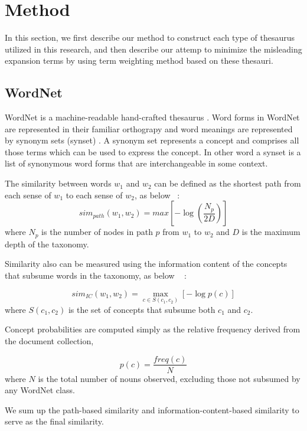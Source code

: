 \section{Method}
In this section, we first describe our method to construct each type of thesaurus utilized in this research, and then describe our attemp to minimize the misleading expansion terms by using term weighting method based on these thesauri.

\subsection{WordNet}
WordNet is a machine-readable hand-crafted thesaurus \cite{miller90}. Word forms in WordNet are represented in their familiar orthograpy and word meanings are represented by synonym sets (synset) \cite{fellbaum98}.
A synonym set represents a concept and comprises all those terms which can be used to express the concept. In other word a synset is a list of synonymous word forms that are interchangeable in some context.

The similarity between words $w_1$ and $w_2$ can be defined as the shortest
path from each sense of $w_1$ to each sense of $w_2$, as
below~\cite{leacock98} :
\begin{displaymath}
  sim_{path}(w_1,w_2) = max[-\log(\frac{N_p}{2D})]
\end{displaymath}
where $N_p$ is the number of nodes in path $p$ from $w_1$ to $w_2$ and $D$
is the maximum depth of the taxonomy. 

Similarity also can be measured  using the information content of the concepts that subsume words in the taxonomy, as below ~\cite{resnik95} :

\[sim_{IC}(w_1,w_2) = \max_{c \in S(c_1,c_2)} [-\log p(c)] \]
where $S(c_1,c_2)$ is the set of concepts that subsume both $c_1$ and $c_2$.

Concept probabilities are computed simply as the relative frequency derived from the document collection,

\[p(c) = \frac{freq(c)}{N}\]
where $N$ is the total number of nouns observed, excluding those not subsumed by any WordNet class.

We sum up the path-based similarity and information-content-based similarity to serve as the final similarity.


